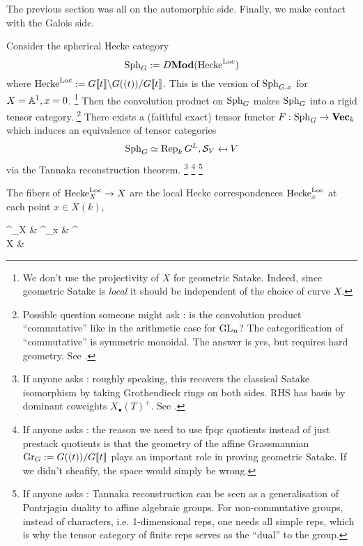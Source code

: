 \documentclass[./main.tex]{subfiles}
\begin{document}
The previous section was all on the automorphic side.
Finally, we make contact with the Galois side.

\begin{prop}

  Consider the spherical Hecke category \[
    \operatorname{Sph}_G := D\mathbf{Mod}(\mathrm{Hecke}^{\mathrm{Loc}})
  \]
  where $\mathrm{Hecke}^{\mathrm{Loc}} := G\llbracket t \rrbracket \backslash G((t)) / G\llbracket t \rrbracket$.
  This is the version of $\operatorname{Sph}_{G,x}$ for $X = \mathbb{A}^1, x = 0$.
  \footnote{
    We don't use the projectivity of $X$ for geometric Satake.
    Indeed, since geometric Satake is \emph{local}
    it should be independent of the choice of curve $X$.
  }
  Then the convolution product on $\operatorname{Sph}_G$ 
  makes $\operatorname{Sph}_G$ into a rigid tensor category.
  \footnote{
    Possible question someone might ask : 
    is the convolution product ``commutative'' like in
    the arithmetic case for $\operatorname{GL}_n$?
    The categorification of ``commutative'' is
    symmetric monoidal.
    The answer is yes, but requires hard geometry.
    See \cite[Section 5.2]{Zhu-16}.
  }
  There exists a (faithful exact) tensor functor $F : \operatorname{Sph}_G \to \mathbf{Vec}_k$ 
  which induces an equivalence of tensor categories 
  \[
    \operatorname{Sph}_G \simeq \operatorname{Rep}_k G^L , \mathcal{S}_V \mapsfrom V
  \]
  via the Tannaka reconstruction theorem.
  \footnote{
    If anyone asks :
    roughly speaking,
    this recovers the classical Satake isomorphism
    by taking Grothendieck rings on both sides.
    RHS has basis by dominant coweights $X_\bullet(T)^+$.
    See \cite[Section 5.6]{Zhu-16}.
  }
  \footnote{
    If anyone asks :
    the reason we need to use fpqc quotients instead of
    just prestack quotients is that
    the geometry of the affine Grassmannian 
    $\operatorname{Gr}_G := G((t)) / G\llbracket t \rrbracket$ plays an important role in
    proving geometric Satake.
    If we didn't sheafify, 
    the space would simply be wrong.
  }
  \footnote{
    If anyone asks :
    Tannaka reconstruction can be seen as a generalisation of
    Pontrjagin duality to affine algebraic groups.
    For non-commutative groups,
    instead of characters, i.e. 1-dimensional reps,
    one needs all simple reps,
    which is why the tensor category of finite reps serves as
    the ``dual'' to the group.
  }
\end{prop}
The fibers of $\mathrm{Hecke}^{\mathrm{Loc}}_X \to X$ are 
the local Hecke correspondences $\mathrm{Hecke}^{\mathrm{Loc}}_x$ at each point $x \in X(k)$,
\begin{cd}
	{\HECKE^\LOC_X} & {\HECKE^\LOC_x} & {\HECKE^\LOC} \\
	X & \PT
	\arrow[from=1-1, to=2-1]
	\arrow["x"{description}, from=2-2, to=2-1]
	\arrow[from=1-2, to=1-1]
	\arrow[from=1-2, to=2-2]
	\arrow["\lrcorner"{anchor=center, pos=0.125, rotate=-90}, draw=none, from=1-2, to=2-1]
	\arrow["\simeq"{description}, draw=none, from=1-2, to=1-3]
	\arrow["{\text{choice of $\bC\bbrkt{t} \simeq \cO^\wedge_x$}}"{description}, shift left=5, draw=none, from=1-2, to=1-3]
\end{cd}
\end{document}
